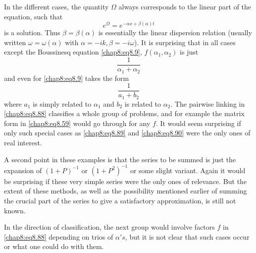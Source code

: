 In the different cases, the quantity $\Omega$ always corresponds to the linear part of the equation, such that 
$$
e^\Omega=e^{-\alpha x+\beta(\alpha)t}
$$
is a solution. Thus $\beta=\beta(\alpha)$ is essentially the linear dispersion relation (usually written $\omega=\omega(\alpha)$ with $\alpha=-ik, \beta=-i\omega$). It is surprising that in all cases except the Boussinesq equation \eqref{chap8:eq8.9}, $f(\alpha_1,\alpha_2)$ is just
\begin{equation}
\frac{1}{\alpha_1+\alpha_2}\tag{8.89}\label{chap8:eq8.89}
\end{equation}\pageoriginale
and even for \eqref{chap8:eq8.9} takes the form
\begin{equation}
\frac{1}{a_1+b_2}\tag{8.90}\label{chap8:eq8.90}
\end{equation}
where $a_1$ is simply related to $\alpha_1$ and $b_2$ is related to $\alpha_2$. The pairwise linking in \eqref{chap8:eq8.88} classifies a whole group of problems, and for example the matrix form in \eqref{chap8:eq8.59} would go through for any $f$. It would seem surprising if only such special cases as \eqref{chap8:eq8.89} and \eqref{chap8:eq8.90} were the only ones of real interest.

A second point in these examples is that the series to be summed is just the expansion of $(1+P)^{-1}$ or $(1+P^2)^{-1}$ or some slight variant. Again it would be surprising if these very simple series were the only ones of relevance. But the extent of these methods, as well as the possibility mentioned earlier of summing the crucial part of the series to give a satisfactory approximation, is still not known.

In the direction of classification, the next group would involve factors $f$ in \eqref{chap8:eq8.88} depending on trios of $\alpha's$, but it is not clear that such cases occur or what one could do with them.

